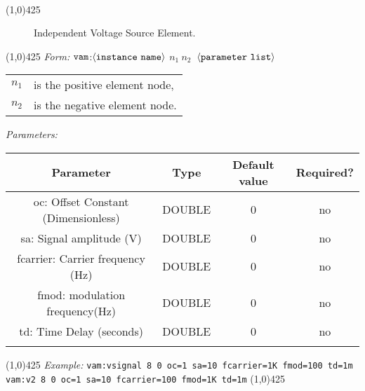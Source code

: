 \documentclass{article}
\begin{document}
\\
\hrulefill\linethickness{0.5mm}\line(1,0){425}
\normalsize
\newline
\begin{figure}[h]
\centerline{\epsfxsize=0.75in}
\caption{Independent Voltage Source Element.}
\end{figure}
\newline
\linethickness{0.5mm} \line(1,0){425}
\newline
\textit{Form:}
$\tt vam$:$\langle \tt{instance\ name}\rangle$ $n_1\ n_2\ $
$\langle \tt{parameter\ list}\rangle$
\newline
\begin{tabular}{r l}
$n_1$ & is the positive element node, \\
$n_2$ & is the negative element node. \\
\end{tabular}
\newline
\textit{Parameters:}
\begin{table}[H]
\begin{tabular}{|c|c|c|c|}
\hline
Parameter&Type&Default value&Required?\\
\hline
oc: Offset Constant (Dimensionless) & DOUBLE & 0 & no\\
\hline
sa: Signal amplitude (V) & DOUBLE & 0 & no\\
\hline
fcarrier: Carrier frequency (Hz) & DOUBLE & 0 & no\\
\hline
fmod: modulation frequency(Hz) & DOUBLE & 0 & no\\
\hline
td: Time Delay (seconds) & DOUBLE & 0 & no\\
\par
\hline
\end{tabular}
\end{table}
\noindent\linethickness{0.5mm}\line(1,0){425}
\newline
\textit{Example:}
\newline
\texttt{vam:vsignal\ 8\ 0\ oc=1 sa=10 fcarrier=1K fmod=100 td=1m}
\newline
\texttt{vam:v2\ 8\ 0\ oc=1 sa=10 fcarrier=100 fmod=1K td=1m}
\newline
\linethickness{0.5mm} \line(1,0){425}
\end{document}
